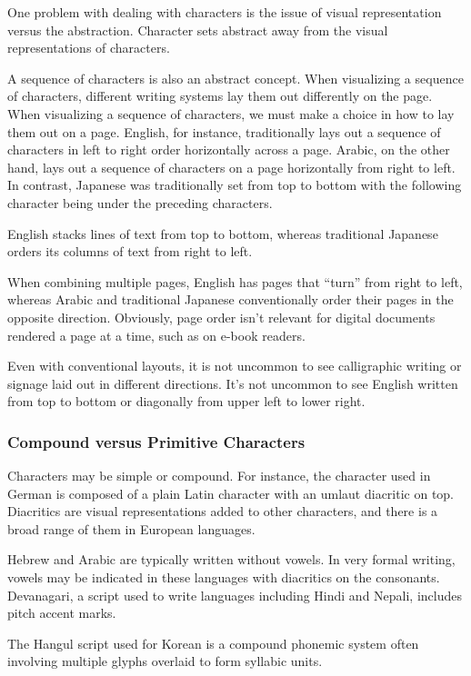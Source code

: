 One problem with dealing with characters is the issue of visual
representation versus the abstraction.  Character sets abstract away
from the visual representations of characters.  

A sequence of characters is also an abstract concept.  When
visualizing a sequence of characters, different writing systems lay
them out differently on the page.  When visualizing a sequence of
characters, we must make a choice in how to lay them out on a page.
English, for instance, traditionally lays out a sequence of characters
in left to right order horizontally across a page. 
Arabic, on the other hand, lays out a sequence of
characters on a page horizontally from right to left.  In contrast,
Japanese was traditionally set from top to bottom with the following
character being under the preceding characters.

English stacks lines of text from top to bottom, whereas traditional
Japanese orders its columns of text from right to left.  

When combining multiple pages, English has pages that ``turn'' from
right to left, whereas Arabic and traditional Japanese conventionally
order their pages in the opposite direction.  Obviously, page order
isn't relevant for digital documents rendered a page at a time, such
as on e-book readers.

Even with conventional layouts, it is not uncommon to see calligraphic
writing or signage laid out in different directions.  It's not
uncommon to see English written from top to bottom or diagonally from
upper left to lower right.


\subsubsection{Compound versus Primitive Characters}

Characters may be simple or compound.  For instance, the character
 used in German is composed of a plain Latin 
character with an umlaut diacritic on top.  Diacritics are visual
representations added to other characters, and there is a broad range
of them in European languages.

Hebrew and Arabic are typically written without vowels.  In very
formal writing, vowels may be indicated in these languages with
diacritics on the consonants.  Devanagari, a script used to write
languages including Hindi and Nepali, includes pitch accent marks.

The Hangul script used for Korean is a compound phonemic system often
involving multiple glyphs overlaid to form syllabic units.


